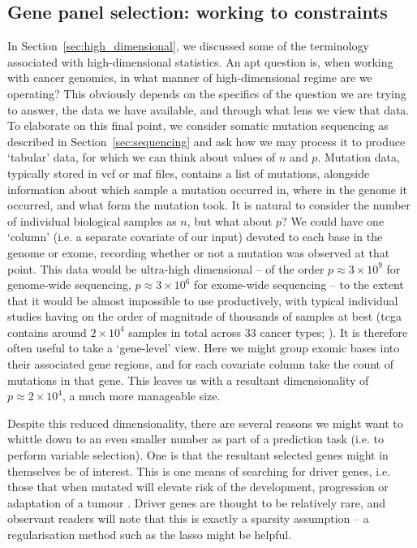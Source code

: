 \documentclass[thesis.tex]{subfiles}
\begin{document}
\subsection{Gene panel selection: working to constraints}
In Section~\ref{sec:high_dimensional}, we discussed some of the terminology associated with high-dimensional statistics. An apt question is, when working with cancer genomics, in what manner of high-dimensional regime are we operating? This obviously depends on the specifics of the question we are trying to answer, the data we have available, and through what lens we view that data. To elaborate on this final point, we consider somatic mutation sequencing as described in Section~\ref{sec:sequencing} and ask how we may process it to produce `tabular' data, for which we can think about values of $n$ and $p$. Mutation data, typically stored in \gls{vcf} or \gls{maf} files, contains a list of mutations, alongside information about which sample a mutation occurred in, where in the genome it occurred, and what form the mutation took. It is natural to consider the number of individual biological samples as $n$, but what about $p$? We could have one `column' (i.e. a separate covariate of our input) devoted to each base in the genome or exome, recording whether or not a mutation was observed at that point. This data would be ultra-high dimensional -- of the order $p\approx3\times10^9$ for genome-wide sequencing, $p\approx 3\times 10^6$ for exome-wide sequencing -- to the extent that it would be almost impossible to use productively, with typical individual studies having on the order of magnitude of thousands of samples at best (\gls{tcga} contains around $2\times 10^4$ samples in total across 33 cancer types; \citealp{cancer_genome_atlas_network_genomic_2015}). It is therefore often useful to take a `gene-level' view. Here we might group exomic bases into their associated gene regions, and for each covariate column take the count of mutations in that gene. This leaves us with a resultant dimensionality of $p\approx 2\times10^4$, a much more manageable size.  

Despite this reduced dimensionality, there are several reasons we might want to whittle down to an even smaller number as part of a prediction task (i.e. to perform variable selection). One is that the resultant selected genes might in themselves be of interest. This is one means of searching for driver genes, i.e. those that when mutated will elevate risk of the development, progression or adaptation of a tumour \citep{hanahan_hallmarks_2000, hanahan_hallmarks_2011}. Driver genes are thought to be relatively rare, and observant readers will note that this is exactly a sparsity assumption -- a regularisation method such as the \gls{lasso} might be helpful. 
\end{document}
